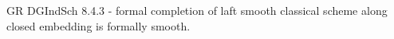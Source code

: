 \documentclass[./main.tex]{subfiles}
\begin{document}
  
GR DGIndSch 8.4.3 - formal completion of 
laft smooth classical scheme along closed embedding is formally smooth.
\end{document}
